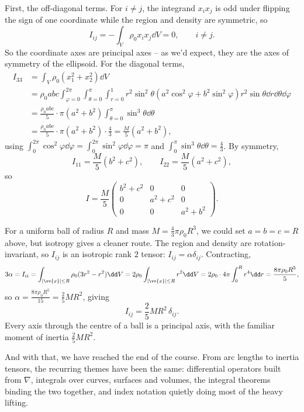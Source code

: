 \begin{example}
	First, the off-diagonal terms. For $i \neq j$, the integrand $x_i x_j$ is odd under flipping the sign of one coordinate while the region and density are symmetric, so
	$$
	I_{ij} = -\int_V \rho_0 x_i x_j \dd V = 0, \quad \quad i \neq j.
	$$
	So the coordinate axes are principal axes -- as we'd expect, they are the axes of symmetry of the ellipsoid. For the diagonal terms,
	\begin{align*}
		I_{33} &= \int_V \rho_0 (x_1^2 + x_2^2) \dd V \\
		&= \rho_0 abc\int_{\varphi = 0}^{2 \pi} \int_{\theta = 0}^{\pi} \int_{r = 0}^1 r^2 \sin^2 \theta \left(a^2 \cos^2 \varphi + b^2 \sin^2 \varphi\right) r^2 \sin \theta \dd r \dd \theta \dd \varphi \\
		&= \frac{\rho_0 abc}{5} \cdot \pi (a^2 + b^2) \int_{\theta = 0}^{\pi} \sin^3 \theta \dd \theta \\
		&= \frac{\rho_0 abc}{5} \cdot \pi(a^2 + b^2) \cdot \frac{4}{3} = \frac{M}{5}(a^2 + b^2),
	\end{align*}
	using $\int_0^{2\pi} \cos^2 \varphi \dd \varphi = \int_0^{2\pi}\sin^2\varphi \dd \varphi = \pi$ and $\int_0^\pi \sin^3 \theta \dd \theta = \frac{4}{3}$. By symmetry,
	$$
	I_{11} = \frac{M}{5}(b^2 + c^2), \quad \quad I_{22} = \frac{M}{5}(a^2 + c^2),
	$$
	so
	$$
	I = \frac{M}{5}\begin{pmatrix}
		b^2 + c^2 & 0 & 0 \\
		0 & a^2 + c^2 & 0 \\
		0 & 0 & a^2 + b^2
	\end{pmatrix}.
	$$
\end{example}

\begin{example}
	For a uniform ball of radius $R$ and mass $M = \frac{4}{3}\pi \rho_0 R^3$, we could set $a = b = c = R$ above, but isotropy gives a cleaner route. The region and density are rotation-invariant, so $I_{ij}$ is an isotropic rank $2$ tensor: $I_{ij} = \alpha \delta_{ij}$. Contracting,
	$$
	3 \alpha = I_{ii} = \int_{|\vv{x}| \leq R} \rho_0 (3 r^2 - r^2) \dd V = 2\rho_0 \int_{|\vv{x}| \leq R} r^2 \dd V = 2 \rho_0 \cdot 4 \pi \int_0^R r^4 \dd r = \frac{8 \pi \rho_0 R^5}{5},
	$$
	so $\alpha = \frac{8 \pi \rho_0 R^5}{15} = \frac{2}{5}MR^2$, giving
	$$
	I_{ij} = \frac{2}{5}MR^2 \, \delta_{ij}.
	$$
	Every axis through the centre of a ball is a principal axis, with the familiar moment of inertia $\frac{2}{5}MR^2$.
\end{example}

And with that, we have reached the end of the course. From arc lengths to inertia tensors, the recurring themes have been the same: differential operators built from $\nabla$, integrals over curves, surfaces and volumes, the integral theorems binding the two together, and index notation quietly doing most of the heavy lifting.

